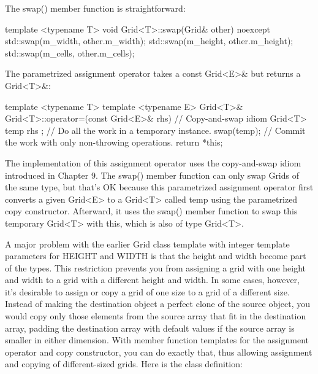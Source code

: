 The swap() member function is straightforward:

\begin{cpp}
template <typename T>
void Grid<T>::swap(Grid& other) noexcept
{
    std::swap(m_width, other.m_width);
    std::swap(m_height, other.m_height);
    std::swap(m_cells, other.m_cells);
}
\end{cpp}

The parametrized assignment operator takes a const Grid<E>\& but returns a Grid<T>\&:

\begin{cpp}
template <typename T>
template <typename E>
Grid<T>& Grid<T>::operator=(const Grid<E>& rhs)
{
    // Copy-and-swap idiom
    Grid<T> temp { rhs }; // Do all the work in a temporary instance.
    swap(temp); // Commit the work with only non-throwing operations.
    return *this;
}
\end{cpp}

The implementation of this assignment operator uses the copy-and-swap idiom introduced in Chapter 9. The swap() member function can only swap Grids of the same type, but that’s OK because this parametrized assignment operator first converts a given Grid<E> to a Grid<T> called temp using the parametrized copy constructor. Afterward, it uses the swap() member function to swap this temporary Grid<T> with this, which is also of type Grid<T>.


A major problem with the earlier Grid class template with integer template parameters for HEIGHT and WIDTH is that the height and width become part of the types. This restriction prevents you from assigning a grid with one height and width to a grid with a different height and width. In some cases, however, it’s desirable to assign or copy a grid of one size to a grid of a different size. Instead of making the destination object a perfect clone of the source object, you would copy only those elements from the source array that fit in the destination array, padding the destination array with default values if the source array is smaller in either dimension. With member function templates for the assignment operator and copy constructor, you can do exactly that, thus allowing assignment and copying of different-sized grids. Here is the class definition:

